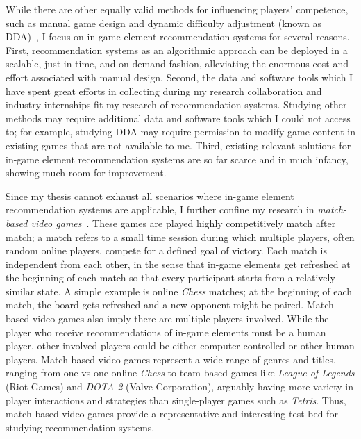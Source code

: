 While there are other equally valid methods for influencing players' competence, such as manual game design and dynamic difficulty adjustment (known as DDA)~\cite{hunicke2005case}, I focus on in-game element recommendation systems for several reasons. First, recommendation systems as an algorithmic approach can be deployed in a scalable, just-in-time, and on-demand fashion, alleviating the enormous cost and effort associated with manual design.
Second, the data and software tools which I have spent great efforts in collecting during my research collaboration and industry internships fit my research of recommendation systems. Studying other methods may require additional data and software tools which I could not access to; for example, studying DDA may require permission to modify game content in existing games that are not available to me. Third, existing relevant solutions for in-game element recommendation systems are so far scarce and in much infancy, showing much room for improvement. 


Since my thesis cannot exhaust all scenarios where in-game element recommendation systems are applicable, I further confine my research in \textit{match-based video games}~\cite{guo2012analysis}. These games are played highly competitively match after match; a match refers to a small time session during which multiple players, often random online players, compete for a defined goal of victory. Each match is independent from each other, in the sense that in-game elements get refreshed at the beginning of each match so that every participant starts from a relatively similar state. A simple example is online \textit{Chess} matches; at the beginning of each match, the board gets refreshed and a new opponent might be paired. Match-based video games also imply there are multiple players involved. While the player who receive recommendations of in-game elements must be a human player, other involved players could be either computer-controlled or other human players. Match-based video games represent a wide range of genres and titles, ranging from one-vs-one online \textit{Chess} to team-based games like \textit{League of Legends} (Riot Games) and \textit{DOTA 2} (Valve Corporation), arguably having more variety in player interactions and strategies than single-player games such as \textit{Tetris}. Thus, match-based video games provide a representative and interesting test bed for studying recommendation systems.



